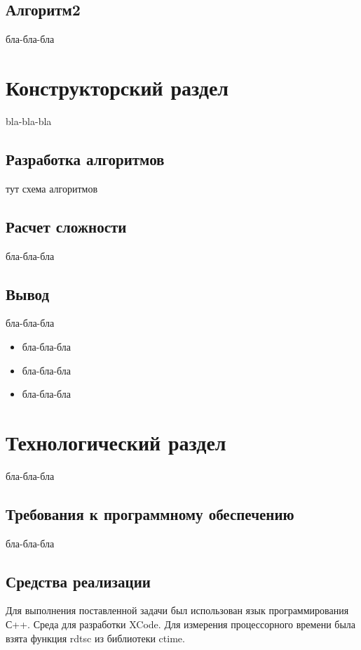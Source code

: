 \documentclass[12pt, a4paper]{report}
\begin{document}
	\section{Алгоритм2}
	бла-бла-бла
	

	\chapter{Конструкторский раздел}
	
	\vspace{-0.5cm} bla-bla-bla
	
	\section{Разработка алгоритмов}
	тут схема алгоритмов

	\newpage

	\section{Расчет сложности}
	бла-бла-бла
	
	\section{Вывод}
	бла-бла-бла
	
	\begin{itemize}
		\item бла-бла-бла
		\item бла-бла-бла
		\item бла-бла-бла
	\end{itemize}
	
	\chapter{Технологический раздел}
	\vspace{-0.5cm}бла-бла-бла
	
	\section{Требования к программному обеспечению}
	бла-бла-бла
	\section{Средства реализации}
	Для выполнения поставленной задачи был использован язык программирования С++. Среда для разработки XCode. Для измерения процессорного времени была взята функция rdtsc из библиотеки ctime.
	
\end{document}

